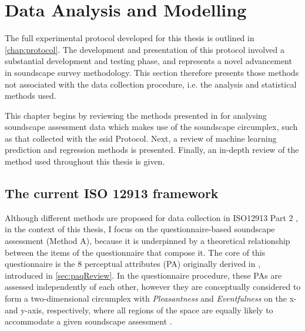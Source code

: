 \chapter{Data Analysis and Modelling}
\label{chap:methods}

 The full experimental protocol developed for this thesis is outlined in \cref{chap:protocol}. The development and presentation of this protocol involved a substantial development and testing phase, and represents a novel advancement in soundscape survey methodology. This section therefore presents those methods not associated with the data collection procedure, i.e. the analysis and statistical methods used.

This chapter begins by reviewing the methods presented in \citet{ISO12913Part2} for analysing soundscape assessment data which makes use of the soundscape circumplex, such as that collected with the \gls{ssid} Protocol. Next, a review of machine learning prediction and regression methods is presented. Finally, an in-depth review of the  method used throughout this thesis is given. 

\section{The current ISO 12913 framework}
\label{sec:current}
Although different methods are proposed for data collection in ISO12913 Part 2 \citep{ISO12913Part2}, in the context of this thesis, I focus on the questionnaire-based soundscape assessment (Method A), because it is underpinned by a theoretical relationship between the items of the questionnaire that compose it. The core of this questionnaire is the 8 perceptual attributes (PA) originally derived in \citet{Axelsson2010principal}, introduced in \cref{sec:paqReview}. In the questionnaire procedure, these PAs are assessed independently of each other, however they are conceptually considered to form a two-dimensional circumplex with \textit{Pleasantness} and \textit{Eventfulness} on the x- and y-axis, respectively, where all regions of the space are equally likely to accommodate a given soundscape assessment \citep{Aletta2016Soundscape}. 

